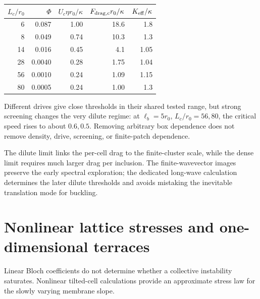 \par\medskip\noindent\begin{minipage}{\linewidth}\centering\small
\begin{tabular}{rrrrr}\toprule $L_c/r_0$ & $\Phi$ & $U_c\eta r_0/\kappa$ & $F_{\rm drag,c}r_0/\kappa$ & $K_{\rm eff}/\kappa$\\\midrule
6&0.087&1.00&18.6&1.8\\8&0.049&0.74&10.3&1.3\\14&0.016&0.45&4.1&1.05\\28&0.0040&0.28&1.75&1.04\\56&0.0010&0.24&1.09&1.15\\80&0.0005&0.24&1.00&1.3\\\bottomrule
\end{tabular}
\end{minipage}\par\medskip
Different drives give close thresholds in their shared tested range, but strong screening changes the very dilute regime: at $\ell_b=5r_0$, $L_c/r_0=56,80$, the critical speed rises to about $0.6,0.5$. Removing arbitrary box dependence does not remove density, drive, screening, or finite-patch dependence.




The dilute limit links the per-cell drag to the finite-cluster scale, while the dense limit requires much larger drag per inclusion. The finite-wavevector images preserve the early spectral exploration; the dedicated long-wave calculation determines the later dilute thresholds and avoids mistaking the inevitable translation mode for buckling.


\section{Nonlinear lattice stresses and one-dimensional terraces}\label{sec:terraces1d}
Linear Bloch coefficients do not determine whether a collective instability saturates. Nonlinear tilted-cell calculations provide an approximate stress law for the slowly varying membrane slope.


